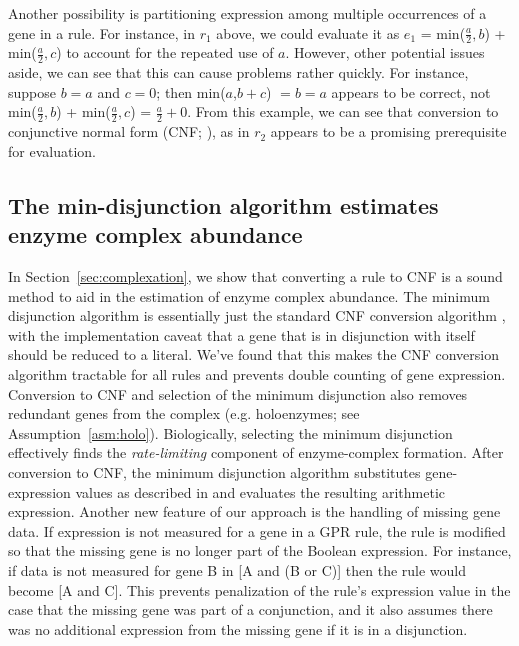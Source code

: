 Another possibility is partitioning expression among multiple occurrences
of a gene in a rule. For instance, in $r_1$ above, we could evaluate
it as $e_1$ =
min($\frac{a}{2},b$) + min($\frac{a}{2},c$) to account for the
repeated use of $a$. However, other potential issues aside, we can see
that this can cause problems rather quickly. For instance, suppose $b
= a$ and $c = 0$; then min($a$,$b+c$) $=b=a$ appears to be correct,
not min($\frac{a}{2},b$) + min($\frac{a}{2},c$) = $\frac{a}{2} + 0$.
From this example, we can see that conversion to conjunctive normal
form (CNF; \citealt{Russell2009}), as in $r_2$ appears to be a
promising prerequisite for evaluation.

\subsection{The min-disjunction algorithm estimates enzyme complex abundance}%

In \suppOrApp Section~\ref{sec:complexation}, we show that
converting a rule to CNF is a sound method
to aid in the estimation of enzyme complex abundance. The minimum disjunction
algorithm is essentially just the standard CNF conversion algorithm \citep{Russell2009},
with the implementation caveat that a gene that is in disjunction with itself should be
reduced to a literal. We've found that this makes the CNF conversion algorithm tractable
for all rules and prevents double counting of gene
expression. Conversion to CNF and selection of the minimum disjunction
also removes redundant genes from the complex (e.g. holoenzymes; see
\suppOrApp Assumption~\ref{asm:holo}). Biologically, selecting the
minimum disjunction effectively finds the \emph{rate-limiting}
component of enzyme-complex formation. After conversion to CNF, the
minimum disjunction algorithm substitutes gene-expression values as
described in \citealt{Lee2012} and evaluates the resulting arithmetic
expression. Another new feature of our approach is the handling of
missing gene data. If expression is not measured for a gene in a GPR
rule, the rule is modified so that the missing gene is no longer part
of the Boolean expression. For instance, if data is not measured for
gene B in [A and (B or C)] then the rule would become [A and C]. This
prevents penalization of the rule's expression value in the case that
the missing gene was part of a conjunction, and it also assumes there
was no additional expression from the missing gene if it is in a
disjunction.

